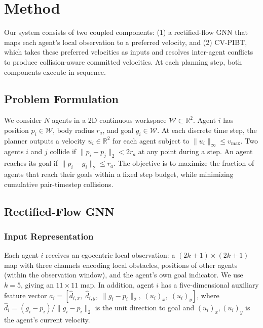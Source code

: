 \section{Method}
\label{sec:method}

Our system consists of two coupled components: (1) a rectified-flow GNN that maps each agent's local observation to a preferred velocity, and (2) CV-PIBT, which takes these preferred velocities as inputs and resolves inter-agent conflicts to produce collision-aware committed velocities. At each planning step, both components execute in sequence.

\subsection{Problem Formulation}

We consider $N$ agents in a 2D continuous workspace $\mathcal{W} \subset \mathbb{R}^2$. Agent $i$ has position $p_i \in \mathcal{W}$, body radius $r_a$, and goal $g_i \in \mathcal{W}$. At each discrete time step, the planner outputs a velocity $u_i \in \mathbb{R}^2$ for each agent subject to $\|u_i\|_\infty \leq v_{\max}$. Two agents $i$ and $j$ collide if $\|p_i - p_j\|_2 < 2r_a$ at any point during a step. An agent reaches its goal if $\|p_i - g_i\|_2 \leq r_a$. The objective is to maximize the fraction of agents that reach their goals within a fixed step budget, while minimizing cumulative pair-timestep collisions.

\subsection{Rectified-Flow GNN}
\label{sec:method:flow}

\subsubsection{Input Representation}

Each agent $i$ receives an egocentric local observation: a $(2k{+}1) \times (2k{+}1)$ map with three channels encoding local obstacles, positions of other agents (within the observation window), and the agent's own goal indicator. We use $k{=}5$, giving an $11 \times 11$ map. In addition, agent $i$ has a five-dimensional auxiliary feature vector $a_i = [\hat{d}_{i,x},\; \hat{d}_{i,y},\; \|g_i - p_i\|_2,\; (u_i)_x,\; (u_i)_y]$, where $\hat{d}_i = (g_i - p_i)/\|g_i - p_i\|_2$ is the unit direction to goal and $(u_i)_x, (u_i)_y$ is the agent's current velocity.

